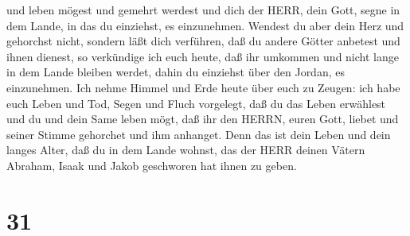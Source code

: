 und leben mögest und gemehrt werdest und dich der HERR, dein Gott, segne
in dem Lande, in das du einziehst, es einzunehmen.  Wendest
du aber dein Herz und gehorchst nicht, sondern läßt dich verführen, daß
du andere Götter anbetest und ihnen dienest,  so verkündige
ich euch heute, daß ihr umkommen und nicht lange in dem Lande bleiben
werdet, dahin du einziehst über den Jordan, es einzunehmen.
 Ich nehme Himmel und Erde heute über euch zu Zeugen: ich
habe euch Leben und Tod, Segen und Fluch vorgelegt, daß du das Leben
erwählest und du und dein Same leben mögt,  daß ihr den
HERRN, euren Gott, liebet und seiner Stimme gehorchet und ihm anhanget.
Denn das ist dein Leben und dein langes Alter, daß du in dem Lande
wohnst, das der HERR deinen Vätern Abraham, Isaak und Jakob geschworen
hat ihnen zu geben.

\hypertarget{section-30}{%
\section{31}\label{section-30}}

